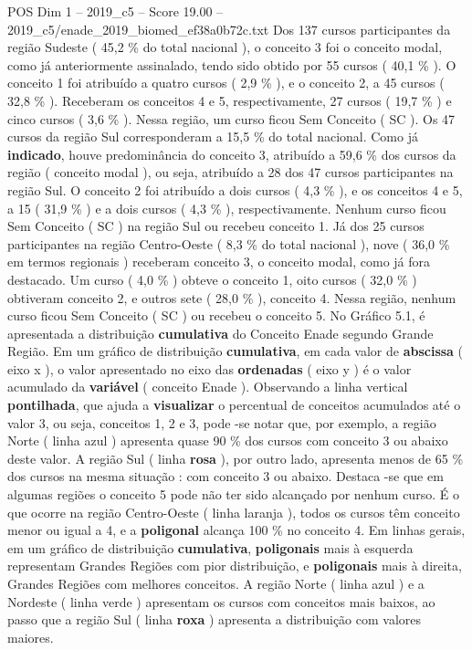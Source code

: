 \begin{textsample}{POS Dim 1 – 2019\_c5 – Score 19.00 – 2019\_c5/enade\_2019\_biomed\_ef38a0b72c.txt}
Dos 137 cursos participantes da região Sudeste ( 45,2 \% do total nacional ), o conceito 3 foi o conceito modal, como já anteriormente assinalado, tendo sido obtido por 55 cursos ( 40,1 \% ).
O conceito 1 foi atribuído a quatro cursos ( 2,9 \% ), e o conceito 2, a 45 cursos ( 32,8 \% ).
Receberam os conceitos 4 e 5, respectivamente, 27 cursos ( 19,7 \% ) e cinco cursos ( 3,6 \% ).
Nessa região, um curso ficou Sem Conceito ( SC ).
Os 47 cursos da região Sul corresponderam a 15,5 \% do total nacional.
Como já \textbf{indicado}, houve predominância do conceito 3, atribuído a 59,6 \% dos cursos da região ( conceito modal ), ou seja, atribuído a 28 dos 47 cursos participantes na região Sul.
O conceito 2 foi atribuído a dois cursos ( 4,3 \% ), e os conceitos 4 e 5, a 15 ( 31,9 \% ) e a dois cursos ( 4,3 \% ), respectivamente.
Nenhum curso ficou Sem Conceito ( SC ) na região Sul ou recebeu conceito 1.
Já dos 25 cursos participantes na região Centro-Oeste ( 8,3 \% do total nacional ), nove ( 36,0 \% em termos regionais ) receberam conceito 3, o conceito modal, como já fora destacado.
Um curso ( 4,0 \% ) obteve o conceito 1, oito cursos ( 32,0 \% ) obtiveram conceito 2, e outros sete ( 28,0 \% ), conceito 4.
Nessa região, nenhum curso ficou Sem Conceito ( SC ) ou recebeu o conceito 5.
No Gráfico 5.1, é apresentada a distribuição \textbf{cumulativa} do Conceito Enade segundo Grande Região.
Em um gráfico de distribuição \textbf{cumulativa}, em cada valor de \textbf{abscissa} ( eixo x ), o valor apresentado no eixo das \textbf{ordenadas} ( eixo y ) é o valor acumulado da \textbf{variável} ( conceito Enade ).
Observando a linha vertical \textbf{pontilhada}, que ajuda a \textbf{visualizar} o percentual de conceitos acumulados até o valor 3, ou seja, conceitos 1, 2 e 3, pode -se notar que, por exemplo, a região Norte ( linha azul ) apresenta quase 90 \% dos cursos com conceito 3 ou abaixo deste valor.
A região Sul ( linha \textbf{rosa} ), por outro lado, apresenta menos de 65 \% dos cursos na mesma situação : com conceito 3 ou abaixo.
Destaca -se que em algumas regiões o conceito 5 pode não ter sido alcançado por nenhum curso.
É o que ocorre na região Centro-Oeste ( linha laranja ), todos os cursos têm conceito menor ou igual a 4, e a \textbf{poligonal} alcança 100 \% no conceito 4.
Em linhas gerais, em um gráfico de distribuição \textbf{cumulativa}, \textbf{poligonais} mais à esquerda representam Grandes Regiões com pior distribuição, e \textbf{poligonais} mais à direita, Grandes Regiões com melhores conceitos.
A região Norte ( linha azul ) e a Nordeste ( linha verde ) apresentam os cursos com conceitos mais baixos, ao passo que a região Sul ( linha \textbf{roxa} ) apresenta a distribuição com valores maiores.

\end{textsample}
